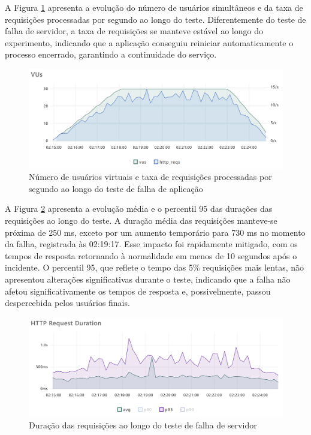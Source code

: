 A Figura \ref{fig:process-failing-vus-and-reqs} apresenta a evolução do número de usuários simultâneos e da taxa de requisições processadas por segundo ao longo do teste. Diferentemente do teste de falha de servidor, a taxa de requisições se manteve estável ao longo do experimento, indicando que a aplicação conseguiu reiniciar automaticamente o processo encerrado, garantindo a continuidade do serviço.

\begin{figure}[H]
    \centering
    \includegraphics[width=1\textwidth]{assets/process-failing-test/vus-and-reqs.png}
    \caption{Número de usuários virtuais e taxa de requisições processadas por segundo ao longo do teste de falha de aplicação}
    \label{fig:process-failing-vus-and-reqs}
\end{figure}

A Figura \ref{fig:process-failing-req-duration} apresenta a evolução média e o percentil 95 das durações das requisições ao longo do teste. A duração média das requisições manteve-se próxima de 250 ms, exceto por um aumento temporário para 730 ms no momento da falha, registrada às 02:19:17. Esse impacto foi rapidamente mitigado, com os tempos de resposta retornando à normalidade em menos de 10 segundos após o incidente. O percentil 95, que reflete o tempo das 5\% requisições mais lentas, não apresentou alterações significativas durante o teste, indicando que a falha não afetou significativamente os tempos de resposta e, possivelmente, passou despercebida pelos usuários finais.

\begin{figure}[H]
    \centering
    \includegraphics[width=1\textwidth]{assets/process-failing-test/req-duration.png}
    \caption{Duração das requisições ao longo do teste de falha de servidor}
    \label{fig:process-failing-req-duration}
\end{figure}

